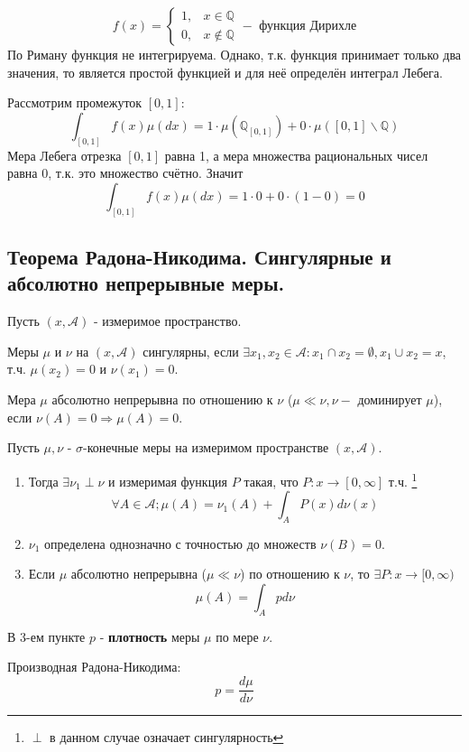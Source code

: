 \begin{exmp}
	\[
	f(x) =
	\begin{cases}
		1, & x \in \mathbb{Q} \\
		0, & x \notin \mathbb{Q}
	\end{cases}
	- \text{ функция Дирихле}
	\]
	По Риману функция не интегрируема. Однако, т.к. функция принимает только два значения, то является простой функцией и для неё определён интеграл Лебега.
	
	Рассмотрим промежуток $[0, 1]$:
	\[ \int_{[0,1]} f(x) \mu (dx) = 1 \cdot \mu \left( \mathbb{Q}_{[0,1]} \right) + 0 \cdot \mu ([0,1] \backslash \mathbb{Q}) \]
	Мера Лебега отрезка $[0,1]$ равна 1, а мера множества рациональных чисел равна 0, т.к. это множество счётно. Значит
	\[ \int_{[0,1]} f(x) \mu (dx) = 1 \cdot 0 + 0 \cdot (1 - 0) = 0 \]
\end{exmp}

\subsection{Теорема Радона-Никодима. Сингулярные и абсолютно непрерывные меры.}

Пусть $(x, \mathcal{A})$ - измеримое пространство.

\begin{definition}
	Меры $\mu$ и $\nu$ на $(x, \mathcal{A})$ сингулярны, если $\exists x_1, x_2 \in \mathcal{A}: x_1 \cap x_2 = \emptyset, x_1 \cup x_2 = x$, т.ч. $\mu (x_2) = 0$ и $\nu (x_1) = 0$.
\end{definition}

\begin{definition}
	Мера $\mu$ абсолютно непрерывна по отношению к $\nu$ ($\mu \ll \nu, \nu - \text{ доминирует } \mu$), если $\nu(A) = 0 \Rightarrow \mu(A) = 0$.
\end{definition}

\begin{theorem}
	Пусть $\mu, \nu$ - $\sigma$-конечные меры на измеримом пространстве $(x, \mathcal{A})$.
	\begin{enumerate}
		\item Тогда $\exists \nu_1 \perp \nu$ и измеримая функция $P$ такая, что $P: x \to [0, \infty]$ т.ч. \footnote{$\perp$ в данном случае означает сингулярность}
		\[  \forall A \in \mathcal{A}; \mu(A) = \nu_1 (A) + \int_A P (x) d \nu (x)  \]
		\item $\nu_1$ определена однозначно с точностью до множеств $\nu (B) = 0$.
		\item Если $\mu$ абсолютно непрерывна ($\mu \ll \nu$) по отношению к $\nu$, то $\exists P: x \to [0, \infty)$
		\[ \mu (A) = \int_A p d \nu \]
	\end{enumerate}
\end{theorem}
\begin{remark}
	В 3-ем пункте $p$ - \textbf{плотность} меры $\mu$ по мере $\nu$.
	
	Производная Радона-Никодима:
	\[ p = \frac{d \mu}{d \nu} \]
\end{remark}

